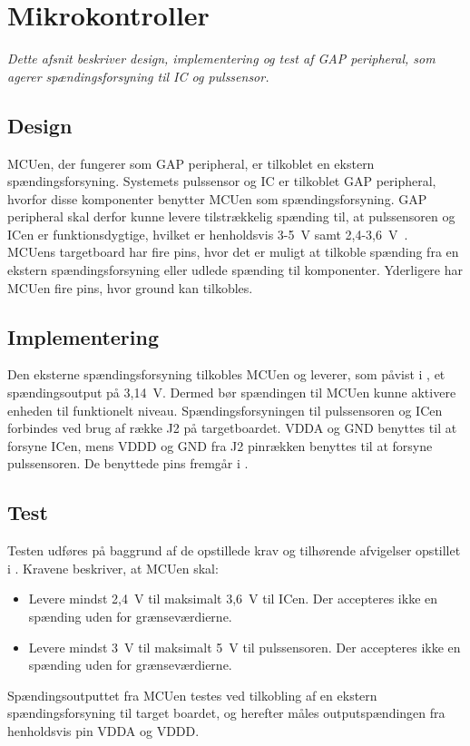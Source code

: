 \section{Mikrokontroller}
\textit{Dette afsnit beskriver design, implementering og test af GAP peripheral, som agerer spændingsforsyning til IC og pulssensor.}

\subsection{Design}
MCUen, der fungerer som GAP peripheral, er tilkoblet en ekstern spændingsforsyning. Systemets pulssensor og IC er tilkoblet GAP peripheral, hvorfor disse komponenter benytter MCUen som spændingsforsyning. GAP peripheral skal derfor kunne levere tilstrækkelig spænding til, at pulssensoren og ICen er funktionsdygtige, hvilket er henholdsvis 3-5~V samt 2,4-3,6~V~\citep{Jimb02016,Murphy2016}. \\
MCUens targetboard har fire pins, hvor det er muligt at tilkoble spænding fra en ekstern spændingsforsyning eller udlede spænding til komponenter. Yderligere har MCUen fire pins, hvor ground kan tilkobles. \citep{Semiconductor2016}

\subsection{Implementering}
Den eksterne spændingsforsyning tilkobles MCUen og leverer, som påvist i , et spændingsoutput på 3,14~V. Dermed bør spændingen til MCUen kunne aktivere enheden til funktionelt niveau.
Spændingsforsyningen til pulssensoren og ICen forbindes ved brug af række J2 på targetboardet. VDDA og GND benyttes til at forsyne ICen, mens VDDD og GND fra J2 pinrækken benyttes til at forsyne pulssensoren. De benyttede pins fremgår i .

\subsection{Test}
Testen udføres på baggrund af de opstillede krav og tilhørende afvigelser opstillet i . Kravene beskriver, at MCUen skal:
\begin{itemize}
	\item Levere mindst 2,4~V til maksimalt 3,6~V til ICen. Der accepteres ikke en spænding uden for grænseværdierne.
	\item Levere mindst 3~V til maksimalt 5~V til pulssensoren. Der accepteres ikke en spænding uden for grænseværdierne.
\end{itemize}
Spændingsoutputtet fra MCUen testes ved tilkobling af en ekstern spændingsforsyning til target boardet, og herefter måles outputspændingen fra henholdsvis pin VDDA og VDDD.

